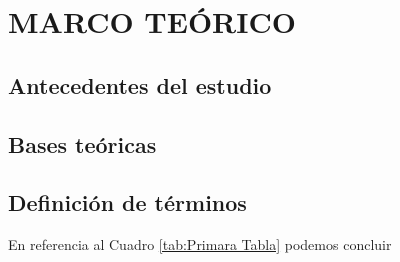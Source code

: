 \chapter{MARCO TEÓRICO}
  \section{Antecedentes del estudio}
  \section{Bases teóricas}
  \section{Definición de términos}

  En referencia al Cuadro \ref{tab:Primara Tabla} podemos concluir